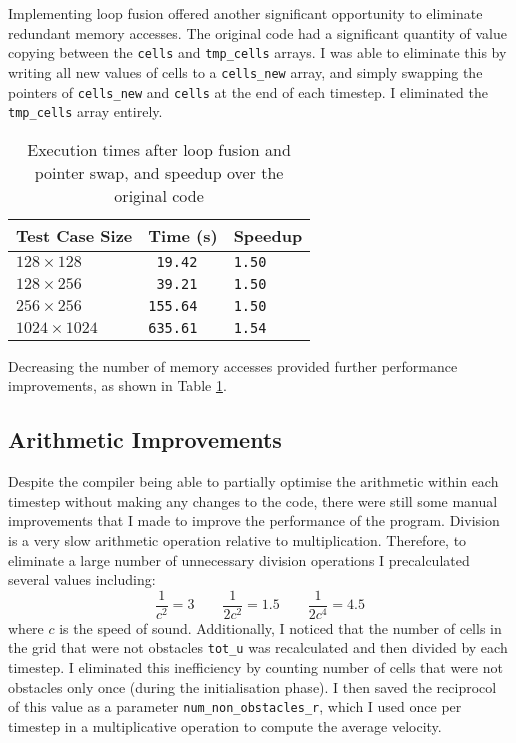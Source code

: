\documentclass[11pt, twocolumn, a4paper]{article}
\begin{document}
Implementing loop fusion offered another significant opportunity to eliminate redundant memory accesses.
The original code had a significant quantity of value copying between the \texttt{cells} and \texttt{tmp\_cells} arrays.
I was able to eliminate this by writing all new values of cells to a \texttt{cells\_new} array, and simply swapping the pointers of \texttt{cells\_new} and \texttt{cells} at the end of each timestep.
I eliminated the \texttt{tmp\_cells} array entirely.

\begin{table}[htbp]
  \begin{center}
  \caption{Execution times after loop fusion and pointer swap, and speedup over the original code}\label{tab:loop_fusion_pointer_swap}
  \begin{tabular}{l | l l} 
      \hline\hline
      Test Case Size&Time (s)&Speedup\\
      \hline
      $128 \times 128$&\texttt{ 19.42}&\texttt{1.50}\\
      $128 \times 256$&\texttt{ 39.21}&\texttt{1.50}\\
      $256 \times 256$&\texttt{155.64}&\texttt{1.50}\\
      $1024 \times 1024$&\texttt{635.61}&\texttt{1.54}\\
      \hline
    \end{tabular}
  \end{center}
\end{table}

Decreasing the number of memory accesses provided further performance improvements, as shown in Table \ref{tab:loop_fusion_pointer_swap}.

\subsection{Arithmetic Improvements}

Despite the compiler being able to partially optimise the arithmetic within each timestep without making any changes to the code, there were still some manual improvements that I made to improve the performance of the program.
Division is a very slow arithmetic operation relative to multiplication.
Therefore, to eliminate a large number of unnecessary division operations I precalculated several values including:
\[
    \frac{1}{c^2} = 3\qquad
    \frac{1}{2c^2} = 1.5\qquad
    \frac{1}{2c^4} = 4.5
\]
where $c$ is the speed of sound.
Additionally, I noticed that the number of cells in the grid that were not obstacles \texttt{tot\_u} was recalculated and then divided by each timestep.
I eliminated this inefficiency by counting number of cells that were not obstacles only once (during the initialisation phase).
I then saved the reciprocol of this value as a parameter \texttt{num\_non\_obstacles\_r}, which I used once per timestep in a multiplicative operation to compute the average velocity.
\end{document}
